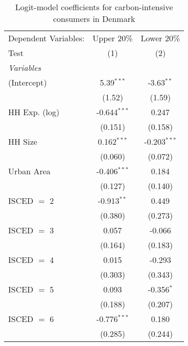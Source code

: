 
\begin{table}[htbp!]
   \centering
   \small
   \begin{adjustbox}{width = 1\textwidth, max height = 0.95\textheight, center}
      \begin{threeparttable}[b]
         \caption{\label{tab:Logit_1_DNK} Logit-model coefficients for carbon-intensive consumers in Denmark}
         \begin{tabular}{lcc}
            \tabularnewline \midrule \midrule
            Dependent Variables: & Upper 20\%     & Lower 20\%\\   
            Test                 & (1)            & (2)\\  
            \midrule
            \emph{Variables}\\
            (Intercept)          & 5.39$^{***}$   & -3.63$^{**}$\\   
                                 & (1.52)         & (1.59)\\   
            HH Exp. (log)        & -0.644$^{***}$ & 0.247\\   
                                 & (0.151)        & (0.158)\\   
            HH Size              & 0.162$^{***}$  & -0.203$^{***}$\\   
                                 & (0.060)        & (0.072)\\   
            Urban Area           & -0.406$^{***}$ & 0.184\\   
                                 & (0.127)        & (0.140)\\   
            ISCED $=$ 2          & -0.913$^{**}$  & 0.449\\   
                                 & (0.380)        & (0.273)\\   
            ISCED $=$ 3          & 0.057          & -0.066\\   
                                 & (0.164)        & (0.183)\\   
            ISCED $=$ 4          & 0.015          & -0.293\\   
                                 & (0.303)        & (0.343)\\   
            ISCED $=$ 5          & 0.093          & -0.356$^{*}$\\   
                                 & (0.188)        & (0.207)\\   
            ISCED $=$ 6          & -0.776$^{***}$ & 0.180\\   
                                 & (0.285)        & (0.244)\\   

\end{tabular}
\end{threeparttable}
\end{adjustbox}
\end{table}
